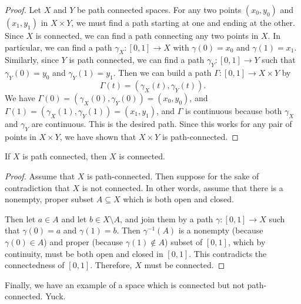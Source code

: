 \documentclass[noname]{notes}
\begin{document}
\begin{proof}
	Let $X$ and $Y$ be path connected spaces. For any two points $(x_0, y_0)$ and $(x_1, y_1)$ in $X \times Y$, we must find a path starting at one and ending at the other. Since $X$ is connected, we can find a path connecting any two points in $X$. In particular, we can find a path $\gamma_X \colon [0,1] \to X$ with $\gamma(0) = x_0$ and $\gamma(1) = x_1$. Similarly, since $Y$ is path connected, we can find a path $\gamma_Y \colon [0,1] \to Y$ such that $\gamma_Y(0) = y_0$ and $\gamma_Y(1) = y_1$. Then we can build a path $\Gamma \colon [0,1] \to X \times Y$ by
	\[
		\Gamma(t) = (\gamma_X(t), \gamma_Y(t)). 
	\]
	We have $\Gamma(0) = (\gamma_X(0),\gamma_Y(0)) = (x_0, y_0)$, and $\Gamma(1) = (\gamma_X(1), \gamma_Y(1)) = (x_1, y_1)$, and $\Gamma$ is continuous because both $\gamma_X$ and $\gamma_Y$ are continuous. This is the desired path. Since this works for any pair of points in $X \times Y$, we have shown that $X \times Y$ is path-connected. 
\end{proof}

\begin{theorem}
	If $X$ is path connected, then $X$ is connected. 
\end{theorem}

\begin{proof}
	Assume that $X$ is path-connected. Then suppose for the sake of contradiction that $X$ is not connected. In other words, assume that there is a nonempty, proper subset $A \subseteq X$ which is both open and closed. 
	
	Then let $a \in A$ and let $b \in X \setminus A$, and join them by a path $\gamma \colon [0,1] \to X$ such that $\gamma(0) = a$ and $\gamma(1) = b$. Then $\gamma^{-1}(A)$ is a nonempty (because $\gamma(0) \in A$) and proper (because $\gamma(1) \not \in A$) subset of $[0,1]$, which by continuity, must be both open and closed in $[0,1]$. This contradicts the connectedness of $[0,1]$. Therefore, $X$ must be connected. 
\end{proof}


Finally, we have an example of a space which is connected but not path-connected. Yuck. 
\end{document}
